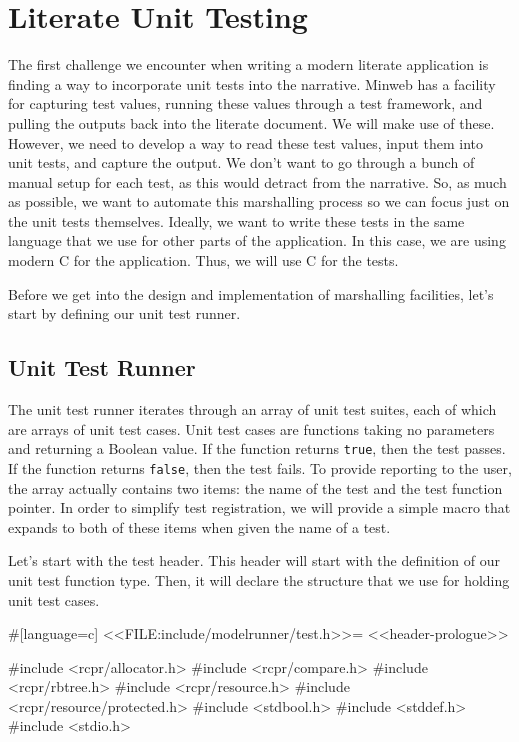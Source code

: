 \section{Literate Unit Testing}

The first challenge we encounter when writing a modern literate application is
finding a way to incorporate unit tests into the narrative. Minweb has a
facility for capturing test values, running these values through a test
framework, and pulling the outputs back into the literate document.  We will
make use of these.  However, we need to develop a way to read these test values,
input them into unit tests, and capture the output.  We don't want to go through
a bunch of manual setup for each test, as this would detract from the narrative.
So, as much as possible, we want to automate this marshalling process so we can
focus just on the unit tests themselves. Ideally, we want to write these tests
in the same language that we use for other parts of the application.  In this
case, we are using modern C for the application.  Thus, we will use C for the
tests.

Before we get into the design and implementation of marshalling facilities,
let's start by defining our unit test runner.

\subsection{Unit Test Runner}

The unit test runner iterates through an array of unit test suites, each of
which are arrays of unit test cases.  Unit test cases are functions taking no
parameters and returning a Boolean value. If the function returns \verb/true/,
then the test passes. If the function returns \verb/false/, then the test fails.
To provide reporting to the user, the array actually contains two items: the
name of the test and the test function pointer. In order to simplify test
registration, we will provide a simple macro that expands to both of these items
when given the name of a test.

Let's start with the test header.  This header will start with the definition of
our unit test function type.  Then, it will declare the structure that we use
for holding unit test cases.

#[language=c]
<<FILE:include/modelrunner/test.h>>=
<<header-prologue>>

#include <rcpr/allocator.h>
#include <rcpr/compare.h>
#include <rcpr/rbtree.h>
#include <rcpr/resource.h>
#include <rcpr/resource/protected.h>
#include <stdbool.h>
#include <stddef.h>
#include <stdio.h>


